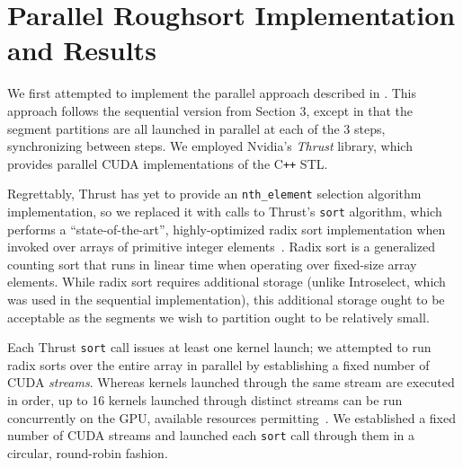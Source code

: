 \documentclass[letterpaper, 12pt]{article}
\let\supercite\cite
\renewcommand{\cite}[1]{\textnormal{~\supercite{#1}}}
\begin{document}
\begin{sidewaysfigure}

\vspace{-4ex}
\caption{\label{fig:seqpar2}{\em
  Radius Determination Runtimes over Arrays of Length $n\cdot 10^6$, $k = 2$
}}
\end{sidewaysfigure}

\begin{sidewaysfigure}

\vspace{-4ex}
\caption{\label{fig:seqpar100}{\em
  Radius Determination Runtimes over Arrays of Length $n\cdot 10^6$, $k = 100$
}}
\end{sidewaysfigure}

\clearpage
\section{Parallel Roughsort Implementation and Results}

We first attempted to implement the parallel approach described in \supercite{altman89}.
This approach follows the sequential version from Section 3, except in that the segment partitions are all launched in parallel
  at each of the 3 steps, synchronizing between steps.
We employed Nvidia's \textit{Thrust} library, which provides parallel CUDA implementations of the C\texttt{++} STL.

Regrettably, Thrust has yet to provide an \texttt{nth_element} selection algorithm implementation, so we replaced it with calls
  to Thrust's \texttt{sort} algorithm, which performs a ``state-of-the-art'', highly-optimized radix sort
  implementation when invoked over arrays of primitive integer elements\cite{thrustradix, leischner09}.
Radix sort is a generalized counting sort that runs in linear time when operating over fixed-size array elements.
While radix sort requires additional storage (unlike Introselect, which was used in the sequential implementation), this
  additional storage ought to be acceptable as the segments we wish to partition ought to be relatively small.

Each Thrust \texttt{sort} call issues at least one kernel launch; we attempted to run radix sorts over the entire array in
  parallel by establishing a fixed number of CUDA \textit{streams}.
Whereas kernels launched through the same stream are executed in order, up to 16 kernels launched through distinct streams can be
  run concurrently on the GPU, available resources permitting\cite{cuda}.
We established a fixed number of CUDA streams and launched each \texttt{sort} call through them in a circular, round-robin
  fashion.
\end{document}
